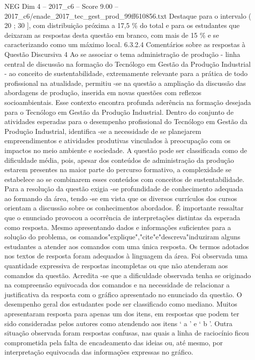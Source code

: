 \begin{textsample}{NEG Dim 4 – 2017\_c6 – Score 9.00 – 2017\_c6/enade\_2017\_tec\_gest\_prod\_99ff610856.txt}
Destaque para o intervalo ( 20 ; 30 ], com distribuição próxima a 17,5 \% do total e para os estudantes que deixaram as respostas desta questão em branco, com mais de 15 \% e se caracterizando como um máximo local. 6.3.2.4 Comentários sobre as respostas à Questão Discursiva 4 Ao se associar o tema administração de produção - linha central de discussão na formação do Tecnólogo em Gestão da Produção Industrial - ao conceito de sustentabilidade, extremamente relevante para a prática de todo profissional na atualidade, permitiu -se na questão a ampliação da discussão das abordagens de produção, inserida em novas questões com reflexos socioambientais.
Esse contexto encontra profunda aderência na formação desejada para o Tecnólogo em Gestão da Produção Industrial.
Dentro do conjunto de atividades esperadas para o desempenho profissional do Tecnólogo em Gestão da Produção Industrial, identifica -se a necessidade de se planejarem empreendimentos e atividades produtivas vinculados à preocupação com os impactos no meio ambiente e sociedade.
A questão pode ser classificada como de dificuldade média, pois, apesar dos conteúdos de administração da produção estarem presentes na maior parte do percurso formativo, a complexidade se estabelece ao se combinarem esses conteúdos com conceitos de sustentabilidade.
Para a resolução da questão exigia -se profundidade de conhecimento adequada ao formando da área, tendo -se em vista que os diversos currículos dos cursos orientam a discussão sobre os conhecimentos abordados.
É importante ressaltar que o enunciado provocou a ocorrência de interpretações distintas da esperada como resposta.
Mesmo apresentando dados e informações suficientes para a solução do problema, os comandos"explique","cite"e"descreva"induziram alguns estudantes a atender aos comandos com uma única resposta.
Os termos adotados nos textos de resposta foram adequados à linguagem da área.
Foi observada uma quantidade expressiva de respostas incompletas ou que não atenderam aos comandos da questão.
Acredita -se que a dificuldade observada tenha se originado na compreensão equivocada dos comandos e na necessidade de relacionar a justificativa da resposta com o gráfico apresentado no enunciado da questão.
O desempenho geral dos estudantes pode ser classificado como mediano.
Muitos apresentaram resposta para apenas um dos itens, em respostas que podem ter sido consideradas pelos autores como atendendo aos itens ‘ a ’ e ‘ b ’.
Outra situação observada foram respostas confusas, nas quais a linha de raciocínio ficou comprometida pela falta de encadeamento das ideias ou, até mesmo, por interpretação equivocada das informações expressas no gráfico.

\end{textsample}
